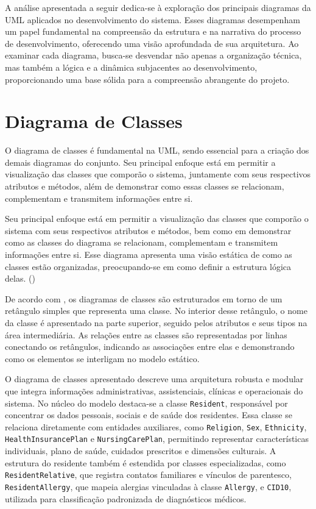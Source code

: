 A análise apresentada a seguir dedica-se à exploração dos principais diagramas da UML aplicados no desenvolvimento do sistema. Esses diagramas desempenham um papel fundamental na compreensão da estrutura e na narrativa do processo de desenvolvimento, oferecendo uma visão aprofundada de sua arquitetura. Ao examinar cada diagrama, busca-se desvendar não apenas a organização técnica, mas também a lógica e a dinâmica subjacentes ao desenvolvimento, proporcionando uma base sólida para a compreensão abrangente do projeto.

\section{Diagrama de Classes}

O diagrama de classes é fundamental na UML, sendo essencial para a criação dos demais diagramas do conjunto. Seu principal enfoque está em permitir a visualização das classes que comporão o sistema, juntamente com seus respectivos atributos e métodos, além de demonstrar como essas classes se relacionam, complementam e transmitem informações entre si.

\begin{citacao}
	Seu principal enfoque está em permitir a visualização das classes que comporão o sistema com seus respectivos atributos e métodos, bem como em demonstrar como as classes do diagrama se relacionam, complementam e transmitem informações entre si. Esse diagrama apresenta uma visão estática de como as classes estão organizadas, preocupando-se em como definir a estrutura lógica delas. (\textcite[p.~133]{Guedes2018})
\end{citacao}

De acordo com \textcite{Sommerville2018ES10}, os diagramas de classes são estruturados em torno de um retângulo simples que representa uma classe. No interior desse retângulo, o nome da classe é apresentado na parte superior, seguido pelos atributos e seus tipos na área intermediária. As relações entre as classes são representadas por linhas conectando os retângulos, indicando as associações entre elas e demonstrando como os elementos se interligam no modelo estático.

O diagrama de classes apresentado descreve uma arquitetura robusta e modular que integra informações administrativas, assistenciais, clínicas e operacionais do sistema. No núcleo do modelo destaca-se a classe \texttt{Resident}, responsável por concentrar os dados pessoais, sociais e de saúde dos residentes. Essa classe se relaciona diretamente com entidades auxiliares, como \texttt{Religion}, \texttt{Sex}, \texttt{Ethnicity}, \texttt{HealthInsurancePlan} e \texttt{NursingCarePlan}, permitindo representar características individuais, plano de saúde, cuidados prescritos e dimensões culturais. A estrutura do residente também é estendida por classes especializadas, como \texttt{ResidentRelative}, que registra contatos familiares e vínculos de parentesco, \texttt{ResidentAllergy}, que mapeia alergias vinculadas à classe \texttt{Allergy}, e \texttt{CID10}, utilizada para classificação padronizada de diagnósticos médicos.

